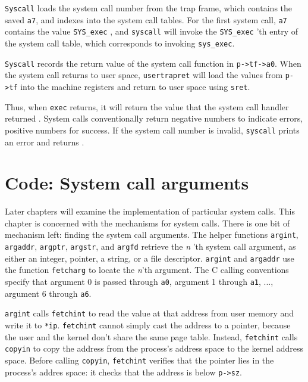 \lstinline{Syscall}
loads the system call number from the trap frame, which
contains the saved
\texttt{a7},
and indexes into the system call tables.
For the first system call, 
\texttt{a7}
contains the value 
\lstinline{SYS_exec}
,
and
\lstinline{syscall}
will invoke the 
\lstinline{SYS_exec} 'th 
entry of the system call table, which corresponds to invoking
\lstinline{sys_exec}.

\lstinline{Syscall}
records the return value of the system call function in
\lstinline{p->tf->a0}.
When the system call returns to user space,
\lstinline{usertrapret}
will load the values
from
\lstinline{p->tf}
into the machine registers
and return to user space
using
\lstinline{sret}.

Thus, when 
\lstinline{exec}
returns, it will return the value
that the system call handler returned
.
System calls conventionally return negative numbers to indicate
errors, positive numbers for success.
If the system call number is invalid,
\lstinline{syscall}
prints an error and returns .

\section{Code: System call arguments}

Later chapters will examine the implementation of
particular system calls.
This chapter is concerned with the mechanisms for system calls.
There is one bit of mechanism left: finding the system call arguments.
The helper functions
\lstinline{argint},
\lstinline{argaddr},
\lstinline{argptr},
\lstinline{argstr},
and
\lstinline{argfd}
retrieve the 
\textit{n} 'th 
system call
argument, as either an integer, pointer, a string, or a file descriptor.
\lstinline{argint}
and
\lstinline{argaddr}
use the function
\lstinline{fetcharg}
to locate the
\textit{n}'th 
argument. The C calling conventions specify that argument 0 is passed
through
\texttt{a0},
argument 1 through
\texttt{a1}, ...,
argument 6 through
\texttt{a6}.

\lstinline{argint} 
calls 
\lstinline{fetchint}
to read the value at that address from user memory and write it to
\lstinline{*ip}.  
\lstinline{fetchint}
cannot simply cast the address to a pointer, because the user and the
kernel don't share the same page table. Instead,
\lstinline{fetchint} calls \lstinline{copyin} to copy the address from the
process's address space to the kernel address space.  Before
calling \lstinline{copyin}, \lstinline{fetchint}
verifies that the
pointer lies in the process's addres
space: it checks
that the address is below
\lstinline{p->sz}.

